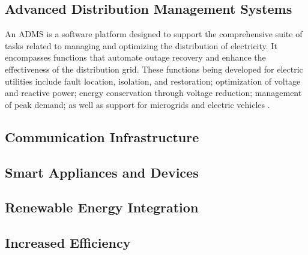 \subsection{Advanced Distribution Management Systems }
An ADMS is a software platform designed to support the comprehensive suite of tasks related to managing and optimizing the distribution of electricity. It encompasses functions that automate outage recovery and enhance the effectiveness of the distribution grid. These functions being developed for electric utilities include fault location, isolation, and restoration; optimization of voltage and reactive power; energy conservation through voltage reduction; management of peak demand; as well as support for microgrids and electric vehicles \cite{avazov2016advanced}.






\subsection{Communication Infrastructure}
\subsection{Smart Appliances and Devices}
\subsection{Renewable Energy Integration}

\subsection{Increased Efficiency}
